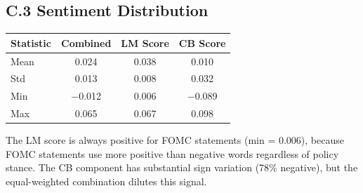 \documentclass[12pt]{article}
\begin{document}
\subsection{C.3 Sentiment Distribution}

\begin{table}[htbp]
\centering
\begin{tabular}{lccc}
\toprule
Statistic & Combined & LM Score & CB Score \\
\midrule
Mean & 0.024 & 0.038 & 0.010 \\
Std & 0.013 & 0.008 & 0.032 \\
Min & $-$0.012 & 0.006 & $-$0.089 \\
Max & 0.065 & 0.067 & 0.098 \\
\bottomrule
\end{tabular}
\end{table}

The LM score is always positive for FOMC statements (min = 0.006), because FOMC statements use more positive than negative words regardless of policy stance. The CB component has substantial sign variation (78\% negative), but the equal-weighted combination dilutes this signal.
\end{document}
